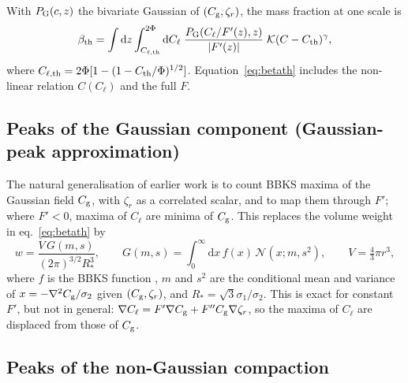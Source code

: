 \documentclass[a4paper,11pt]{article}
\newcommand{\Cg}{C_{\rm g}}
\newcommand{\Cl}{C_{\ell}}
\newcommand{\zr}{\zeta_r}
\newcommand{\dd}{\mathrm{d}}
\begin{document}
With $P_{\rm G}(c,z)$ the bivariate Gaussian of $(\Cg,\zr)$, the mass fraction at one scale is
\cite{Ferrante}
\begin{equation}
\beta_{\rm th}=\int\dd z\int_{C_{\ell,\rm th}}^{2\Phi}\dd\Cl\;\frac{P_{\rm G}(\Cl/F'(z),z)}{|F'(z)|}\;
\mathcal K(C-C_{\rm th})^\gamma ,
\label{eq:betath}
\end{equation}
where $C_{\ell,\rm th}=2\Phi[1-(1-C_{\rm th}/\Phi)^{1/2}]$. Equation~\eqref{eq:betath} includes the
non-linear relation $C(\Cl)$ and the full $F$.

\subsection{Peaks of the Gaussian component (Gaussian-peak approximation)}

The natural generalisation of earlier work is to count BBKS maxima of the Gaussian field $\Cg$,
with $\zr$ as a correlated scalar, and to map them through $F'$; where $F'<0$, maxima of $\Cl$ are
minima of $\Cg$. This replaces the volume weight in eq.~\eqref{eq:betath} by
\begin{equation}
w=\frac{V\,G(m,s)}{(2\pi)^{3/2}R_*^3},\qquad G(m,s)=\int_0^\infty\dd x\,f(x)\,\mathcal N(x;m,s^2),
\qquad V=\tfrac43\pi r^3,
\label{eq:3a}
\end{equation}
where $f$ is the BBKS function \cite{BBKS}, $m$ and $s^2$ are the conditional mean and variance
of $x=-\nabla^2\Cg/\sigma_{2}$ given $(\Cg,\zr)$, and $R_*=\sqrt3\sigma_1/\sigma_2$. This is exact
for constant $F'$, but not in general: $\nabla\Cl=F'\nabla\Cg+F''\Cg\nabla\zr$, so the maxima of
$\Cl$ are displaced from those of $\Cg$.

\subsection{Peaks of the non-Gaussian compaction}
\end{document}
